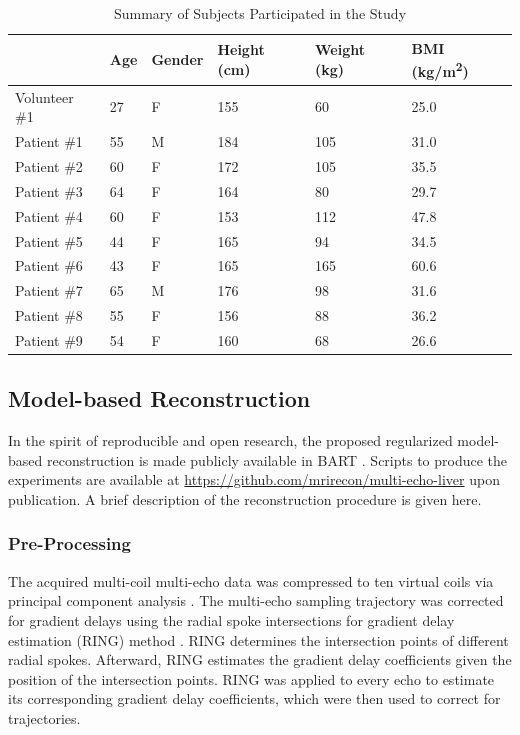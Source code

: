 \documentclass[journal,twoside,web]{ieeecolor}
\begin{document}
\begin{table}
	\caption{Summary of Subjects Participated in the Study}
	\label{TAB:Subject}
	\setlength{\tabcolsep}{3pt}
	\begin{tabular}{m{} m{} m{} m{} m{} m{}}
		\toprule
		& Age & Gender & Height (\si{\centi\meter}) & Weight (\si{\kilogram}) & BMI (\si{\kilogram/\square\meter}) \\
		\hline
		Volunteer \#1 & 27 & F & 155 &  60 & 25.0 \\
		Patient \#1   & 55 & M & 184 & 105 & 31.0 \\ %
		Patient \#2   & 60 & F & 172 & 105 & 35.5 \\ %
		Patient \#3   & 64 & F & 164 &  80 & 29.7 \\ %
		Patient \#4   & 60 & F & 153 & 112 & 47.8 \\ %
		Patient \#5   & 44 & F & 165 &  94 & 34.5 \\ %
		Patient \#6   & 43 & F & 165 & 165 & 60.6 \\ %
		Patient \#7   & 65 & M & 176 &  98 & 31.6 \\ %
		Patient \#8   & 55 & F & 156 &  88 & 36.2 \\ %
		Patient \#9   & 54 & F & 160 &  68 & 26.6 \\ %
		\bottomrule
	\end{tabular}
\end{table}


\subsection{Model-based Reconstruction}

In the spirit of reproducible and open research, 
the proposed regularized model-based reconstruction is made
publicly available in BART \cite{uecker_2015_bart}. 
Scripts to produce the experiments are available at \url{https://github.com/mrirecon/multi-echo-liver} upon publication. 
A brief description of the reconstruction procedure is given here.

\subsubsection*{Pre-Processing}

The acquired multi-coil multi-echo data was compressed to ten virtual coils 
via principal component analysis \cite{huang_2008_scc}. 
The multi-echo sampling trajectory 
was corrected for gradient delays using the
radial spoke intersections for gradient delay estimation (RING) method 
\cite{rosenzweig_2019_ring}. 
RING determines the intersection points of different radial spokes. 
Afterward, RING estimates the gradient delay coefficients 
given the position of the intersection points. 
RING was applied to every echo to estimate 
its corresponding gradient delay coefficients, 
which were then used to correct for trajectories.
\end{document}
